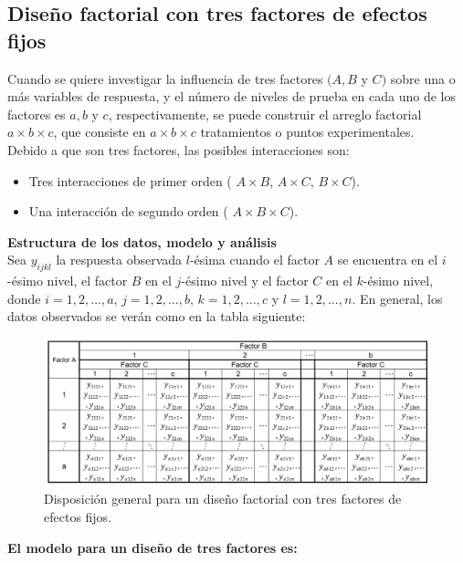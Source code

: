 \subsection{Diseño factorial con tres factores de efectos fijos}
Cuando se quiere investigar la influencia de tres factores $(A, B$ y $C)$ sobre una o más variables de respuesta, y el número de niveles de prueba en cada uno de los factores es $a, b$ y $c$, respectivamente, se puede construir el arreglo factorial $a \times b \times c$, que consiste en $a \times b \times c$ tratamientos o puntos experimentales.\\


Debido a que son tres factores, las posibles interacciones son:
\begin{itemize}
	\item Tres interacciones de primer orden ( $A \times B $,  $A \times C $,  $B \times C $).
	\item Una interacción de segundo orden ( $A \times B \times C $).
\end{itemize}

\textbf{Estructura de los datos, modelo y análisis}\\

Sea $y_{ijkl}$ la respuesta observada $l$-ésima cuando el factor $A$ se encuentra en el $i$-ésimo nivel, el factor $B$ en el $j$-ésimo nivel y el factor $C$ en el $k$-ésimo nivel, donde  $i = 1,2, \dots, a$, $j = 1,2, \dots, b$, $k = 1,2, \dots, c$  y $l = 1,2, \dots, n$. En general, los datos observados se verán como en la tabla siguiente:


\begin{figure}[H] 
	\centering 
	\includegraphics[width=0.90\linewidth]{img/factorial.png} 
	\caption{Disposición general para un diseño factorial con tres factores de efectos fijos.} 
	\label{fig:FactorialTres}
\end{figure}
\FloatBarrier

\textbf{El modelo para un diseño de tres factores es:}\\

